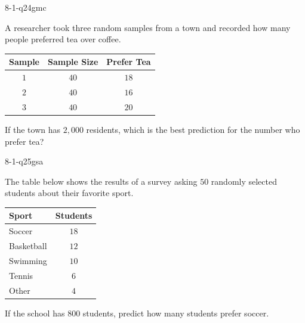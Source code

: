 \begin{practiceQuestion}{8-1-q24}{gmc}
\begin{questionText}
A researcher took three random samples from a town and recorded how many people preferred tea over coffee.

\begin{center}
\begin{tabular}{|c|c|c|}
\hline
\textbf{Sample} & \textbf{Sample Size} & \textbf{Prefer Tea} \\
\hline
$1$ & $40$ & $18$ \\
$2$ & $40$ & $16$ \\
$3$ & $40$ & $20$ \\
\hline
\end{tabular}
\end{center}

If the town has $2{,}000$ residents, which is the best prediction for the number who prefer tea?
\end{questionText}
\end{practiceQuestion}

\begin{practiceQuestion}{8-1-q25}{gsa}
\begin{questionText}
The table below shows the results of a survey asking $50$ randomly selected students about their favorite sport.

\begin{center}
\begin{tabular}{|l|c|}
\hline
\textbf{Sport} & \textbf{Students} \\
\hline
Soccer & $18$ \\
Basketball & $12$ \\
Swimming & $10$ \\
Tennis & $6$ \\
Other & $4$ \\
\hline
\end{tabular}
\end{center}

If the school has $800$ students, predict how many students prefer soccer.
\end{questionText}
\end{practiceQuestion}

